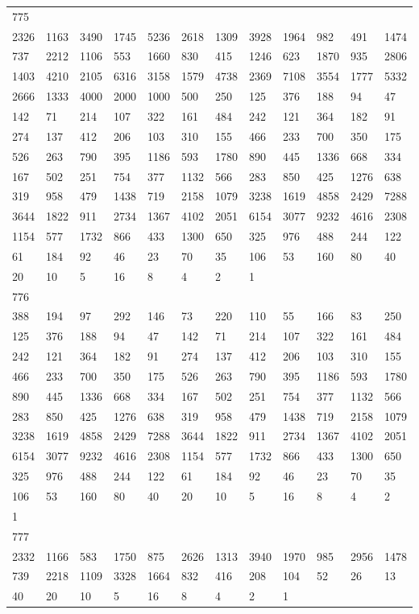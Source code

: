 \begin{longtable}{llllllllllll}
775&&&&&&&&&&&\\
2326& 1163& 3490& 1745& 5236& 2618& 1309& 3928& 1964& 982& 491& 1474\\
737& 2212& 1106& 553& 1660& 830& 415& 1246& 623& 1870& 935& 2806\\
1403& 4210& 2105& 6316& 3158& 1579& 4738& 2369& 7108& 3554& 1777& 5332\\
2666& 1333& 4000& 2000& 1000& 500& 250& 125& 376& 188& 94& 47\\
142& 71& 214& 107& 322& 161& 484& 242& 121& 364& 182& 91\\
274& 137& 412& 206& 103& 310& 155& 466& 233& 700& 350& 175\\
526& 263& 790& 395& 1186& 593& 1780& 890& 445& 1336& 668& 334\\
167& 502& 251& 754& 377& 1132& 566& 283& 850& 425& 1276& 638\\
319& 958& 479& 1438& 719& 2158& 1079& 3238& 1619& 4858& 2429& 7288\\
3644& 1822& 911& 2734& 1367& 4102& 2051& 6154& 3077& 9232& 4616& 2308\\
1154& 577& 1732& 866& 433& 1300& 650& 325& 976& 488& 244& 122\\
61& 184& 92& 46& 23& 70& 35& 106& 53& 160& 80& 40\\
20& 10& 5& 16& 8& 4& 2& 1& \\

776&&&&&&&&&&&\\
388& 194& 97& 292& 146& 73& 220& 110& 55& 166& 83& 250\\
125& 376& 188& 94& 47& 142& 71& 214& 107& 322& 161& 484\\
242& 121& 364& 182& 91& 274& 137& 412& 206& 103& 310& 155\\
466& 233& 700& 350& 175& 526& 263& 790& 395& 1186& 593& 1780\\
890& 445& 1336& 668& 334& 167& 502& 251& 754& 377& 1132& 566\\
283& 850& 425& 1276& 638& 319& 958& 479& 1438& 719& 2158& 1079\\
3238& 1619& 4858& 2429& 7288& 3644& 1822& 911& 2734& 1367& 4102& 2051\\
6154& 3077& 9232& 4616& 2308& 1154& 577& 1732& 866& 433& 1300& 650\\
325& 976& 488& 244& 122& 61& 184& 92& 46& 23& 70& 35\\
106& 53& 160& 80& 40& 20& 10& 5& 16& 8& 4& 2\\
1& \\

777&&&&&&&&&&&\\
2332& 1166& 583& 1750& 875& 2626& 1313& 3940& 1970& 985& 2956& 1478\\
739& 2218& 1109& 3328& 1664& 832& 416& 208& 104& 52& 26& 13\\
40& 20& 10& 5& 16& 8& 4& 2& 1& \\


\end{longtable}
